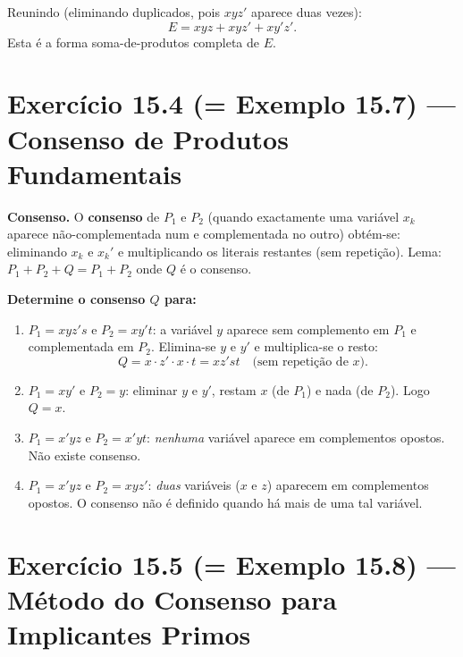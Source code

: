 \documentclass[12pt,a4paper]{article}
\newcommand{\keyword}[1]{\textbf{\textcolor{azul}{#1}}}
\begin{document}
Reunindo (eliminando duplicados, pois $xyz'$ aparece duas vezes):
\[
  E = xyz + xyz' + xy'z'.
\]
Esta é a forma soma-de-produtos completa de $E$.

\section*{Exercício 15.4 (= Exemplo 15.7) — Consenso de Produtos Fundamentais}

\begin{teoriacaixa}
\textbf{Consenso.} O \keyword{consenso} de $P_1$ e $P_2$ (quando exactamente uma
variável $x_k$ aparece não-complementada num e complementada no outro) obtém-se:
eliminando $x_k$ e $x_k'$ e multiplicando os literais restantes (sem repetição).
Lema: $P_1 + P_2 + Q = P_1 + P_2$ onde $Q$ é o consenso.
\end{teoriacaixa}

\textbf{Determine o consenso $Q$ para:}

\begin{enumerate}[label=(\alph*)]
  \item $P_1 = xyz's$ e $P_2 = xy't$: a variável $y$ aparece sem complemento em $P_1$
        e complementada em $P_2$. Elimina-se $y$ e $y'$ e multiplica-se o resto:
        \[
          Q = x \cdot z' \cdot x \cdot t = xz'st \quad \text{(sem repetição de } x\text{).}
        \]

  \item $P_1 = xy'$ e $P_2 = y$: eliminar $y$ e $y'$, restam $x$ (de $P_1$) e nada
        (de $P_2$). Logo $Q = x$.

  \item $P_1 = x'yz$ e $P_2 = x'yt$: \emph{nenhuma} variável aparece em complementos
        opostos. Não existe consenso.

  \item $P_1 = x'yz$ e $P_2 = xyz'$: \emph{duas} variáveis ($x$ e $z$) aparecem em
        complementos opostos. O consenso não é definido quando há mais de uma tal variável.
\end{enumerate}

\section*{Exercício 15.5 (= Exemplo 15.8) — Método do Consenso para Implicantes Primos}
\end{document}
